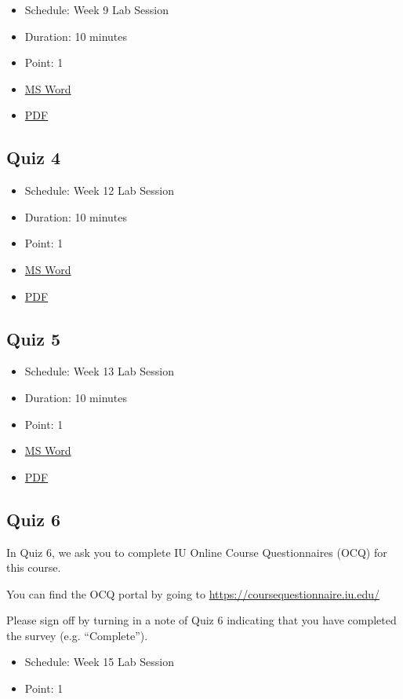\begin{itemize}
\tightlist
\item
  Schedule: Week 9 Lab Session
\item
  Duration: 10 minutes
\item
  Point: 1
\item
  \href{https://drive.google.com/open?id=0B88HKpainTSfejluSnRkQW5Oakk}{MS
  Word}
\item
  \href{https://drive.google.com/open?id=0B88HKpainTSfNmR5b2M0Um1NV28}{PDF}
\end{itemize}

\subsection{Quiz 4}\label{quiz-4}

\begin{itemize}
\tightlist
\item
  Schedule: Week 12 Lab Session
\item
  Duration: 10 minutes
\item
  Point: 1
\item
  \href{https://drive.google.com/open?id=0B88HKpainTSfYzJuN29pY1JoSFU}{MS
  Word}
\item
  \href{https://drive.google.com/open?id=0B88HKpainTSfNGhPMlBadXJURm8}{PDF}
\end{itemize}

\subsection{Quiz 5}\label{quiz-5}

\begin{itemize}
\tightlist
\item
  Schedule: Week 13 Lab Session
\item
  Duration: 10 minutes
\item
  Point: 1
\item
  \href{https://drive.google.com/open?id=0B88HKpainTSfdUl5QktlUGx1dFU}{MS
  Word}
\item
  \href{https://drive.google.com/open?id=0B88HKpainTSfZFU4dE9acktNMG8}{PDF}
\end{itemize}

\subsection{Quiz 6}\label{quiz-6}

In Quiz 6, we ask you to complete IU Online Course Questionnaires (OCQ)
for this course.

You can find the OCQ portal by going to
\url{https://coursequestionnaire.iu.edu/}

Please sign off by turning in a note of Quiz 6 indicating that you have
completed the survey (e.g. ``Complete'').

\begin{itemize}
\tightlist
\item
  Schedule: Week 15 Lab Session
\item
  Point: 1
\end{itemize}
